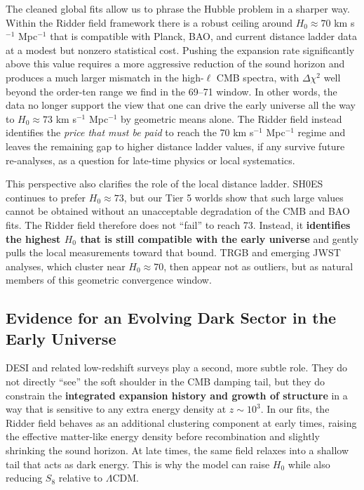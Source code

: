 \documentclass[a4paper,11pt]{article}
\begin{document}
The cleaned global fits allow us to phrase the Hubble problem in a sharper way. Within the Ridder field framework there is a robust ceiling around $H_0 \approx 70$ km s$^{-1}$ Mpc$^{-1}$ that is compatible with Planck, BAO, and current distance ladder data at a modest but nonzero statistical cost. Pushing the expansion rate significantly above this value requires a more aggressive reduction of the sound horizon and produces a much larger mismatch in the high-$\ell$ CMB spectra, with $\Delta\chi^2$ well beyond the order-ten range we find in the 69--71 window. In other words, the data no longer support the view that one can drive the early universe all the way to $H_0 \approx 73$ km s$^{-1}$ Mpc$^{-1}$ by geometric means alone. The Ridder field instead identifies the \emph{price that must be paid} to reach the 70 km s$^{-1}$ Mpc$^{-1}$ regime and leaves the remaining gap to higher distance ladder values, if any survive future re-analyses, as a question for late-time physics or local systematics.

This perspective also clarifies the role of the local distance ladder. SH0ES continues to prefer $H_0 \approx 73$, but our Tier 5 worlds show that such large values cannot be obtained without an unacceptable degradation of the CMB and BAO fits. The Ridder field therefore does not ``fail'' to reach 73. Instead, it \textbf{identifies the highest $H_0$ that is still compatible with the early universe} and gently pulls the local measurements toward that bound. TRGB and emerging JWST analyses, which cluster near $H_0 \approx 70$, then appear not as outliers, but as natural members of this geometric convergence window.

\subsection*{Evidence for an Evolving Dark Sector in the Early Universe}

DESI and related low-redshift surveys play a second, more subtle role. They do not directly ``see'' the soft shoulder in the CMB damping tail, but they do constrain the \textbf{integrated expansion history and growth of structure} in a way that is sensitive to any extra energy density at $z \sim 10^3$. In our fits, the Ridder field behaves as an additional clustering component at early times, raising the effective matter-like energy density before recombination and slightly shrinking the sound horizon. At late times, the same field relaxes into a shallow tail that acts as dark energy. This is why the model can raise $H_0$ while also reducing $S_8$ relative to $\Lambda$CDM.
\end{document}
